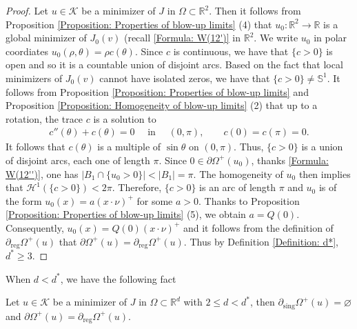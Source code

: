\documentclass[11pt,reqno]{amsart}
\begin{document}
\begin{proof}
	Let $u\in\mathcal{K}$ be a minimizer of $J$ in $\Omega\subset\mathbb{R}^{2}$. Then it follows from Proposition \ref{Proposition: Properties of blow-up limits} (4) that $u_{0}\colon\mathbb{R}^{2}\to\mathbb{R}$ is a global minimizer of $J_{0}(v)$ (recall \eqref{Formula: W(12')} in $\mathbb{R}^{2}$. We write $u_{0}$ in polar coordiates $u_{0}(\rho,\theta)=\rho c(\theta)$. Since $c$ is continuous, we have that $\{c>0\}$ is open and so it is a countable union of disjoint arcs. Based on the fact that local minimizers of $J_{0}(v)$ cannot have isolated zeros, we have that $\{c>0\}\neq\mathbb{S}^{1}$. It follows from Proposition \ref{Proposition: Properties of blow-up limits} and Proposition \ref{Proposition: Homogeneity of blow-up limits} (2) that up to a rotation, the trace $c$ is a solution to
	\begin{align*}
		c''(\theta)+c(\theta)=0\quad\text{ in }\quad(0,\pi),\qquad c(0)=c(\pi)=0.
	\end{align*}
	It follows that $c(\theta)$ is a multiple of $\sin\theta$ on $(0,\pi)$. Thus, $\{c>0\}$ is a union of disjoint arcs, each one of length $\pi$. Since $0\in\partial\varOmega^{+}(u_{0})$, thanks \eqref{Formula: W(12'')}, one has $|B_{1}\cap\{u_{0}>0\}|<|B_{1}|=\pi$. The homogeneity of $u_{0}$ then implies that  $\mathcal{H}^{1}(\{c>0\})<2\pi$. Therefore,  $\{c>0\}$ is an arc of length $\pi$ and $u_{0}$ is of the form $u_{0}(x)=a(x\cdot\nu)^{+}$ for some $a>0$. Thanks to Proposition \ref{Proposition: Properties of blow-up limits} (5), we obtain $a=Q(0)$. Consequently, $u_{0}(x)=Q(0)(x\cdot\nu)^{+}$ and it follows from the definition of $\partial_{\mathrm{reg}}\varOmega^{+}(u)$ that $\partial\varOmega^{+}(u)=\partial_{\mathrm{reg}}\varOmega^{+}(u)$. Thus by Definition \ref{Definition: d*},  $d^{*}\geqslant3$.
\end{proof}
When $d<d^{*}$, we have the following fact
\begin{proposition}
	Let $u\in\mathcal{K}$ be a minimizer of $J$ in $\Omega\subset\mathbb{R}^{d}$ with $2\leqslant d<d^{*}$, then $\partial_{\mathrm{sing}}\varOmega^{+}(u)=\varnothing$ and $\partial\varOmega^{+}(u)=\partial_{\mathrm{reg}}\varOmega^{+}(u)$.
\end{proposition}
\end{document}
